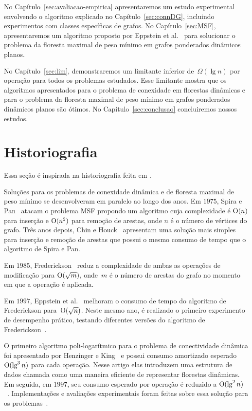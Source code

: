 No Capítulo~\ref{sec:avaliacao-empirica} apresentaremos um estudo experimental envolvendo o algoritmo explicado no Capítulo~\ref{sec:connDG}, incluindo experimentos com classes específicas de grafos.
No Capítulo~\ref{sec:MSF}, apresentaremos um algoritmo proposto por Eppstein et al.~\cite{EPPSTEIN-planar} para solucionar o problema da floresta maximal de peso mínimo em grafos ponderados dinâmicos planos. 

No Capítulo~\ref{sec:lim}, demonstraremos um limitante inferior de~$\Omega(\lg n)$ por operação para todos os problemas estudados. Esse limitante mostra que os algoritmos apresentados para o problema de conexidade em florestas dinâmicas e para o problema da floresta maximal de peso mínimo em grafos ponderados dinâmicos planos são ótimos.
No Capítulo~\ref{sec:conclusao} concluiremos nossos estudos.

\section{Historiografia}

Essa seção é inspirada na historiografia feita em \cite{QC22, HHSRecentAdvances2022, bruceM}.

Soluções para os problemas de conexidade dinâmica e de floresta maximal de peso mínimo se desenvolveram em paralelo ao longo dos anos. Em $1975$, Spira e Pan~\cite{SP1975} atacam o problema MSF propondo um algoritmo cuja complexidade é $\mathrm{O}(n)$ para inserção e $\mathrm{O}(n^2)$ para remoção de arestas, onde $n$ é o número de vértices do grafo. Três anos depois, Chin e Houck~\cite{CH1978} apresentam uma solução mais simples para inserção e remoção de arestas que possui o mesmo consumo de tempo que o algoritmo de Spira e Pan.

Em $1985$, Frederickson~\cite{frederickson1983data} reduz a complexidade de ambas as operações de modificação para $\mathrm{O}(\sqrt{m})$, onde~$m$ é o número de arestas do grafo no momento em que a operação é aplicada.

Em $1997$, Eppstein et al.~\cite{Eppstein1992SparsificationaTF} melhoram o consumo de tempo do algoritmo de Frederickson para~$\mathrm{O}(\sqrt{n})$.
Neste mesmo ano, é realizado o primeiro experimento de desempenho prático, testando diferentes versões do algoritmo de Frederickson~\cite{xpAnalyGiuseppe}.

O primeiro algoritmo poli-logarítmico para o problema de conectividade dinâmica foi apresentado por Henzinger e King~\cite{HenzingerKing} e possui consumo amortizado esperado $\mathrm{O}(\lg^3 n)$ para cada operação. Nesse artigo elas introduzem uma estrutura de dados chamada  como uma maneira eficiente de representar florestas dinâmicas. Em seguida, em $1997$, seu consumo esperado por operação é reduzido a $\mathrm{O}(\lg^2 n)$~\cite{HenzingerThorup}.  Implementações e avaliações experimentais foram feitas sobre essa solução para os problemas~\cite{EmpiricalStudy1997, EmpiricalStudy2002, Zaroliagis2002}.


